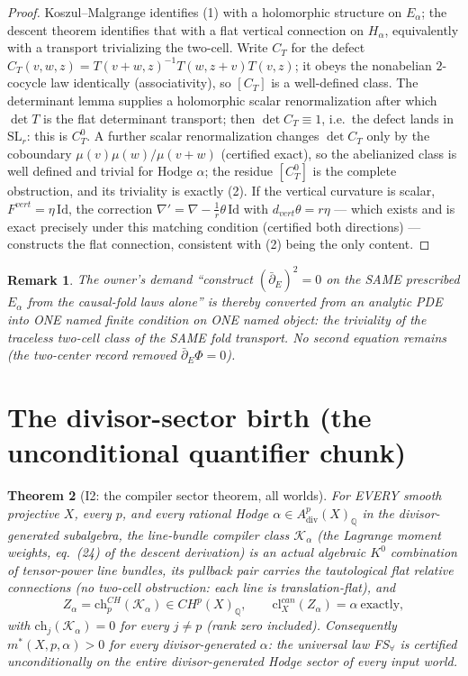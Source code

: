 \documentclass[11pt]{article}
\newtheorem{theorem}{Theorem}
\newtheorem{remark}[theorem]{Remark}
\begin{document}
\begin{proof}
Koszul--Malgrange identifies (1) with a holomorphic structure on $E_\alpha$; the descent
theorem identifies that with a flat vertical connection on $H_\alpha$, equivalently with
a transport trivializing the two-cell. Write $C_T$ for the defect
$C_T(v,w,z)=T(v{+}w,z)^{-1}T(w,z{+}v)T(v,z)$; it obeys the nonabelian $2$-cocycle law
identically (associativity), so $[C_T]$ is a well-defined class. The determinant lemma
supplies a holomorphic scalar renormalization after which $\det T$ is the flat
determinant transport; then $\det C_T\equiv1$, i.e.\ the defect lands in
$\mathrm{SL}_r$: this is $C_T^0$. A further scalar renormalization changes $\det C_T$
only by the coboundary $\mu(v)\mu(w)/\mu(v{+}w)$ (certified exact), so the abelianized
class is well defined and trivial for Hodge $\alpha$; the residue $[C_T^0]$ is the
complete obstruction, and its triviality is exactly (2). If the vertical curvature is
scalar, $F^{vert}=\eta\,\mathrm{Id}$, the correction
$\nabla'=\nabla-\frac1r\theta\,\mathrm{Id}$ with $d_{vert}\theta=r\eta$ --- which exists
and is exact precisely under this matching condition (certified both directions) ---
constructs the flat connection, consistent with (2) being the only content.
\end{proof}

\begin{remark}
The owner's demand \emph{``}construct $(\bar\partial_E)^2=0$ on the SAME prescribed
$E_\alpha$ from the causal-fold laws alone\emph{''} is thereby converted from an analytic
PDE into ONE named finite condition on ONE named object: the triviality of the
traceless two-cell class of the SAME fold transport. No second equation remains
(the two-center record removed $\bar\partial_E\Phi=0$).
\end{remark}

\section{The divisor-sector birth (the unconditional quantifier chunk)}

\begin{theorem}[I2: the compiler sector theorem, all worlds]\label{thm:i2}
For EVERY smooth projective $X$, every $p$, and every rational Hodge
$\alpha\in A^p_{\mathrm{div}}(X)_\mathbb Q$ in the divisor-generated subalgebra,
the line-bundle compiler class $\mathcal K_\alpha$ (the Lagrange moment weights,
eq.~(24) of the descent derivation) is an actual algebraic $K^0$ combination of
tensor-power line bundles, its pullback pair carries the tautological flat relative
connections (no two-cell obstruction: each line is translation-flat), and
\[
Z_\alpha=\mathrm{ch}^{CH}_p(\mathcal K_\alpha)\in CH^p(X)_\mathbb Q,
\qquad \mathrm{cl}^{can}_X(Z_\alpha)=\alpha \ \text{exactly},
\]
with $\mathrm{ch}_j(\mathcal K_\alpha)=0$ for every $j\ne p$ (rank zero included).
Consequently $m^*(X,p,\alpha)>0$ for every divisor-generated $\alpha$: the universal
law FS$_\forall$ is certified unconditionally on the entire divisor-generated Hodge
sector of every input world.
\end{theorem}
\end{document}
